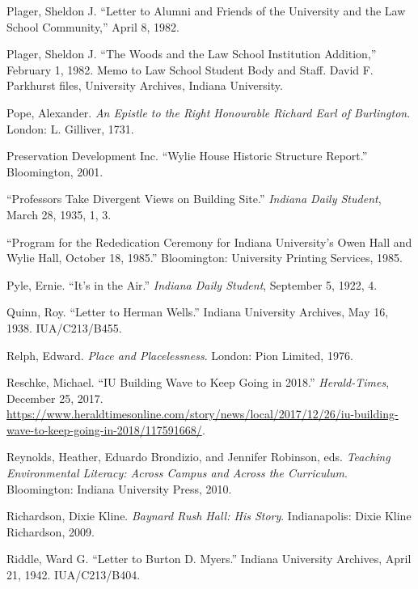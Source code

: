 \documentclass[
  american,
  letterpaper,
]{scrreprt}
\newlength{\cslhangindent}
\newenvironment{CSLReferences}[2] %
 {\begin{list}{}{%
  \setlength{\itemindent}{0pt}
  \setlength{\leftmargin}{0pt}
  \setlength{\parsep}{0pt}
  \ifodd #1
   \setlength{\leftmargin}{\cslhangindent}
   \setlength{\itemindent}{-1\cslhangindent}
  \fi
  \setlength{\itemsep}{#2\baselineskip}}}
 {\end{list}}
\begin{document}
\begin{CSLReferences}{1}{0}
Plager, Sheldon J. {``Letter to Alumni and Friends of the University and
the Law School Community,''} April 8, 1982.

Plager, Sheldon J. {``The Woods and the Law School Institution
Addition,''} February 1, 1982. Memo to Law School Student Body and
Staff. David F. Parkhurst files, University Archives, Indiana
University.

Pope, Alexander. \emph{An Epistle to the Right Honourable Richard Earl
of Burlington}. London: L. Gilliver, 1731.

Preservation Development Inc. {``Wylie House Historic Structure
Report.''} Bloomington, 2001.

{``Professors Take Divergent Views on Building Site.''} \emph{Indiana
Daily Student}, March 28, 1935, 1, 3.

{``Program for the Rededication Ceremony for Indiana University's Owen
Hall and Wylie Hall, October 18, 1985.''} Bloomington: University
Printing Services, 1985.

Pyle, Ernie. {``It's in the Air.''} \emph{Indiana Daily Student},
September 5, 1922, 4.

Quinn, Roy. {``Letter to Herman Wells.''} Indiana University Archives,
May 16, 1938. IUA/C213/B455.

Relph, Edward. \emph{Place and Placelessness}. London: Pion Limited,
1976.

Reschke, Michael. {``IU Building Wave to Keep Going in 2018.''}
\emph{Herald-Times}, December 25, 2017.
\url{https://www.heraldtimesonline.com/story/news/local/2017/12/26/iu-building-wave-to-keep-going-in-2018/117591668/}.

Reynolds, Heather, Eduardo Brondizio, and Jennifer Robinson, eds.
\emph{Teaching Environmental Literacy: Across Campus and Across the
Curriculum}. Bloomington: Indiana University Press, 2010.

Richardson, Dixie Kline. \emph{Baynard Rush Hall: His Story}.
Indianapolis: Dixie Kline Richardson, 2009.

Riddle, Ward G. {``Letter to Burton {D.} Myers.''} Indiana University
Archives, April 21, 1942. IUA/C213/B404.


\end{CSLReferences}
\end{document}
